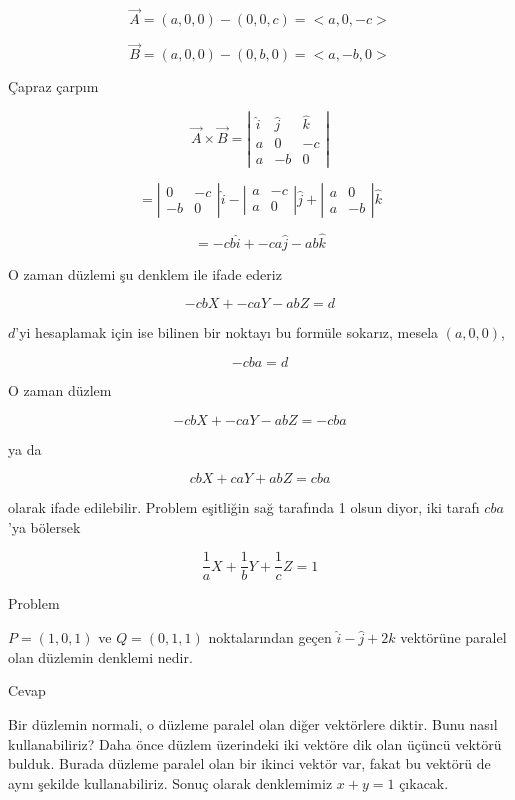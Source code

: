 \documentclass[12pt,fleqn]{article}\usepackage{../../common}
\begin{document}
$$ \vec{A} = (a,0,0) - (0,0,c) = <a,0,-c>$$

$$ \vec{B} = (a,0,0) - (0,b,0) = <a,-b,0>$$

Çapraz çarpım

$$ \vec{A} \times \vec{B} =
\left|\begin{array}{rrr}
\hat{i}& \hat{j}& \hat{k} \\
a & 0 & -c \\
a & -b & 0 
\end{array}\right|
 $$

$$ = 
\left|\begin{array}{rr}
0 & -c \\
-b & 0
\end{array}\right| 
\hat{i}
-
\left|\begin{array}{rr}
a & -c \\
a & 0
\end{array}\right|
\hat{j}
+
\left|\begin{array}{rr}
a & 0 \\
a & -b
\end{array}\right|
\hat{k}
$$

$$ = -cb\hat{i} + -ca\hat{j} -ab \hat{k} $$

O zaman düzlemi şu denklem ile ifade ederiz 

$$ -cbX + -caY -abZ = d $$

$d$'yi hesaplamak için ise bilinen bir noktayı bu formüle sokarız, mesela
$(a,0,0)$, 

$$ -cba  = d $$

O zaman düzlem

$$ -cbX + -caY -abZ = -cba $$

ya da

$$ cbX + caY + abZ = cba $$

olarak ifade edilebilir. Problem eşitliğin sağ tarafında 1 olsun diyor, iki 
tarafı $cba$'ya bölersek

$$ \frac{1}{a}X + \frac{1}{b}Y + \frac{1}{c}Z = 1 $$

Problem

$P=(1,0,1)$ ve $Q=(0,1,1)$ noktalarından geçen $\hat{i}-\hat{j}+2\hat{k}$
vektörüne paralel olan düzlemin denklemi nedir.

Cevap

Bir düzlemin normali, o düzleme paralel olan diğer vektörlere diktir. Bunu nasıl
kullanabiliriz? Daha önce düzlem üzerindeki iki vektöre dik olan üçüncü vektörü
bulduk. Burada düzleme paralel olan bir ikinci vektör var, fakat bu vektörü de
aynı şekilde kullanabiliriz. Sonuç olarak denklemimiz $x+y =1$ çıkacak.
\end{document}
